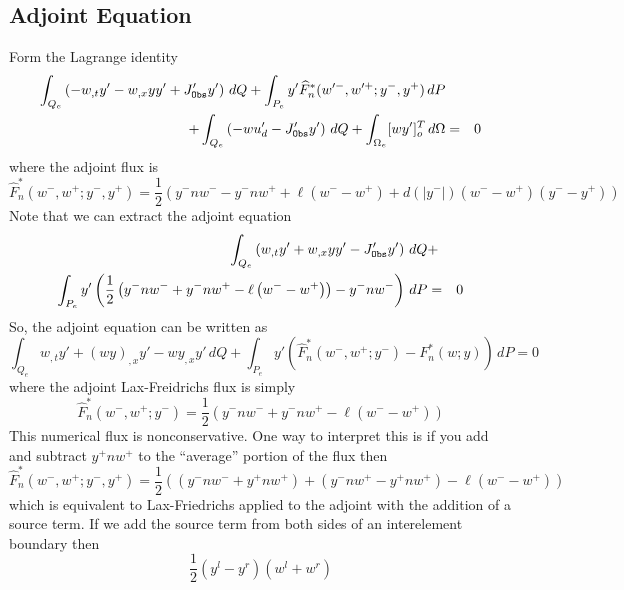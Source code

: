 \documentclass[12pt]{article}
\begin{document}
\subsection{Adjoint Equation}
Form the Lagrange identity
\begin{eqnarray}
   \int_{Q_e} \left( -w_{,t} y' - w_{,x} y y' + J'_{\tt Obs} y' \right) \,dQ
   + \int_{P_e} y' \widehat F^*_n(w'^-,w'^+;y^-,y^+) \,dP    && \nonumber\\
   + \int_{Q_e} \left( -w u'_d - J'_{\tt Obs} y' \right) \,dQ 
   + \int_{\Omega_e} [w y']_o^T \,d\Omega &=& 0 \nonumber
\end{eqnarray}
where the adjoint flux is
\[ \widehat F^*_n(w^-,w^+;y^-,y^+) = \frac{1}{2}\left( 
   y^- n w^- - y^- n w^+ + \ell \left( w^- - w^+ \right) 
   + d(|y^-|)(w^- - w^+)(y^- - y^+) \right) \]
Note that we can extract the adjoint equation
\begin{eqnarray} 
   \int_{Q_e} \left( w_{,t} y' + w_{,x} y y' 
   - J'_{\tt Obs} y' \right) \,dQ &+& \nonumber \\
   \int_{P_e} y' \left( \frac{1}{2}\left( y^- n w^- + y^- n w^+ - 
                 \ell \left( w^- - w^+ \right) \right) - y^- n w^- \right)\,dP
   &=& 0 \nonumber
\end{eqnarray}
%
So, the adjoint equation can be written as
\[ \int_{Q_e} w_{,t} y' + (w y)_{,x} y' - w y_{,x} y'  
   \,dQ +
   \int_{P_e} y' \left( \widehat F^*_n(w^-,w^+;y^-) - F^*_n(w;y) \right)\,dP 
   = 0 \]
where the adjoint Lax-Freidrichs flux is simply
\[ \widehat F^*_n(w^-,w^+;y^-) = \frac{1}{2}\left( y^- n w^- + y^- n w^+ - 
                                 \ell \left( w^- - w^+ \right) \right) \]
%
This numerical flux is nonconservative.  One way to interpret this is if you
add and subtract $y^+nw^+$ to the ``average'' portion of the flux then
\[ \widehat F^*_n(w^-,w^+;y^-,y^+) = \frac{1}{2}\left( 
   (y^- n w^- + y^+ n w^+) + (y^- n w^+ - y^+ n w^+) - \ell \left( w^- - w^+
\right) \right) \] which is equivalent to Lax-Friedrichs applied to the
adjoint with the addition of a source term.  If we add the source term from
both sides of an interelement boundary then
\[ \frac{1}{2} (y^l - y^r ) (w^l + w^r) \]
\end{document}
